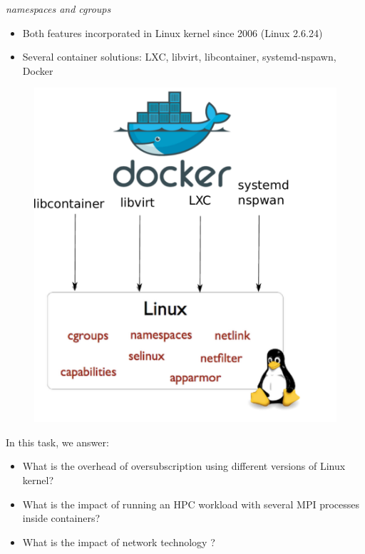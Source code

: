\documentclass[11pt,xcolor=dvipsnames,presentation]{beamer}
\begin{document}
\begin{frame}[label=sec-4-0-2]{\emph{namespaces and cgroups}}
\begin{itemize}
\item Both features incorporated in Linux kernel since 2006 (Linux 2.6.24)
\item Several container solutions: LXC, libvirt, libcontainer, systemd-nspawn, Docker
\end{itemize}

\begin{figure}[!h]
  \center
\includegraphics[scale=0.30]{figures/libcontainer-diagram.pdf}
  \label{fig:hpc}
\end{figure}
\end{frame}

\begin{frame}[label=sec-4-0-3]{In this task, we answer:}
\begin{itemize}
\item What is the overhead of oversubscription using different versions of Linux kernel?
\end{itemize}
\begin{itemize}
\item What is the impact of running an HPC workload with several MPI processes inside containers?
\item What is the impact of network technology ?
\end{itemize}
\end{frame}
\end{document}
